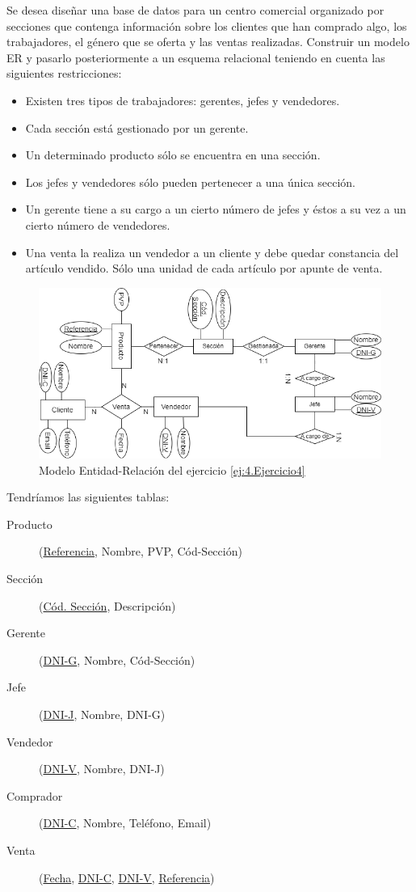 \newpage
\begin{ejercicio}\label{ej:4.Ejercicio4}
Se desea diseñar una base de datos para un centro comercial organizado por secciones que contenga información sobre los clientes que han comprado algo, los trabajadores, el género que se oferta y las ventas realizadas. Construir un modelo ER y pasarlo posteriormente a un esquema relacional teniendo en cuenta las siguientes restricciones:
\begin{itemize}
    \item Existen tres tipos de trabajadores: gerentes, jefes y vendedores.
    \item Cada sección está gestionado por un gerente.
    \item Un determinado producto sólo se encuentra en una sección.
    \item Los jefes y vendedores sólo pueden pertenecer a una única sección.
    \item Un gerente tiene a su cargo a un cierto número de jefes y éstos a su vez a un cierto número de vendedores.
    \item Una venta la realiza un vendedor a un cliente y debe quedar constancia del artículo vendido. Sólo una unidad de cada artículo por apunte de venta.
\end{itemize}

    \begin{figure}[H]
        \centering
        \includegraphics[width=0.8\linewidth]{Imagenes/Ejercicio 4.png}
        \caption{Modelo Entidad-Relación del ejercicio \ref{ej:4.Ejercicio4}}
        \label{fig:Ej4}
    \end{figure}

    Tendríamos las siguientes tablas:
    \begin{description}
        \item [Producto] (\underline{Referencia}, Nombre, PVP, Cód-Sección)
        \item [Sección] (\underline{Cód. Sección}, Descripción)
        \item [Gerente] (\underline{DNI-G}, Nombre, Cód-Sección)
        \item [Jefe] (\underline{DNI-J}, Nombre, DNI-G)
        \item [Vendedor] (\underline{DNI-V}, Nombre, DNI-J)
        \item [Comprador] (\underline{DNI-C}, Nombre, Teléfono, Email)
        \item [Venta] (\underline{Fecha}, \underline{DNI-C}, \underline{DNI-V}, \underline{Referencia})
    \end{description}


\end{ejercicio}
